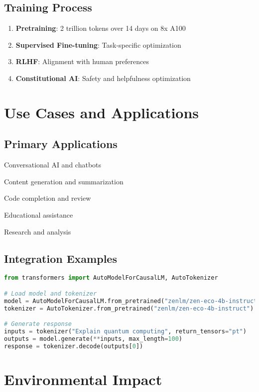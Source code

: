 \documentclass[11pt,a4paper]{article}
\begin{document}
\subsection{Training Process}
\begin{enumerate}
    \item \textbf{Pretraining}: 2 trillion tokens over 14 days on 8x A100
    \item \textbf{Supervised Fine-tuning}: Task-specific optimization
    \item \textbf{RLHF}: Alignment with human preferences
    \item \textbf{Constitutional AI}: Safety and helpfulness optimization
\end{enumerate}

\section{Use Cases and Applications}

\subsection{Primary Applications}
\item Conversational AI and chatbots
\item Content generation and summarization
\item Code completion and review
\item Educational assistance
\item Research and analysis

\subsection{Integration Examples}

\begin{lstlisting}[language=Python, caption=Basic Usage Example]
from transformers import AutoModelForCausalLM, AutoTokenizer

# Load model and tokenizer
model = AutoModelForCausalLM.from_pretrained("zenlm/zen-eco-4b-instruct")
tokenizer = AutoTokenizer.from_pretrained("zenlm/zen-eco-4b-instruct")

# Generate response
inputs = tokenizer("Explain quantum computing", return_tensors="pt")
outputs = model.generate(**inputs, max_length=100)
response = tokenizer.decode(outputs[0])
\end{lstlisting}

\section{Environmental Impact}
\end{document}
